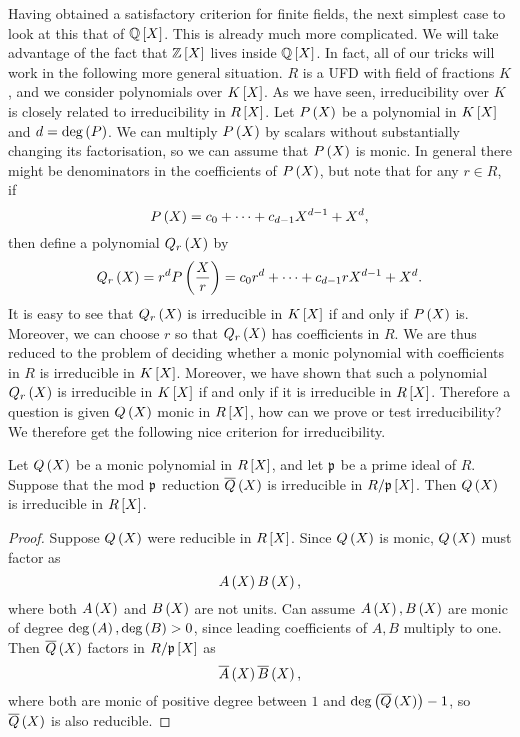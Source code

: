Having obtained a satisfactory criterion for finite fields, the next simplest case to look at this that of $ \Q\sb{X} $. This is already much more complicated. We will take advantage of the fact that $ \Z\sb{X} $ lives inside $ \Q\sb{X} $. In fact, all of our tricks will work in the following more general situation. $ R $ is a UFD with field of fractions $ K $, and we consider polynomials over $ K\sb{X} $. As we have seen, irreducibility over $ K $ is closely related to irreducibility in $ R\sb{X} $. Let $ P\rb{X} $ be a polynomial in $ K\sb{X} $ and $ d = \deg\rb{P} $. We can multiply $ P\rb{X} $ by scalars without substantially changing its factorisation, so we can assume that $ P\rb{X} $ is monic. In general there might be denominators in the coefficients of $ P\rb{X} $, but note that for any $ r \in R $, if
$$ P\rb{X} = c_0 + \dots + c_{d - 1}X^{d - 1} + X^d, $$
then define a polynomial $ Q_r\rb{X} $ by
$$ Q_r\rb{X} = r^dP\rb{\dfrac{X}{r}} = c_0r^d + \dots + c_{d - 1}rX^{d - 1} + X^d. $$
It is easy to see that $ Q_r\rb{X} $ is irreducible in $ K\sb{X} $ if and only if $ P\rb{X} $ is. Moreover, we can choose $ r $ so that $ Q_r\rb{X} $ has coefficients in $ R $. We are thus reduced to the problem of deciding whether a monic polynomial with coefficients in $ R $ is irreducible in $ K\sb{X} $. Moreover, we have shown that such a polynomial $ Q_r\rb{X} $ is irreducible in $ K\sb{X} $ if and only if it is irreducible in $ R\sb{X} $. Therefore a question is given $ Q\rb{X} $ monic in $ R\sb{X} $, how can we prove or test irreducibility? We therefore get the following nice criterion for irreducibility.

\begin{proposition}
Let $ Q\rb{X} $ be a monic polynomial in $ R\sb{X} $, and let $ \pp $ be a prime ideal of $ R $. Suppose that the mod $ \pp $ reduction $ \overline{Q}\rb{X} $ is irreducible in $ R / \pp\sb{X} $. Then $ Q\rb{X} $ is irreducible in $ R\sb{X} $.
\end{proposition}

\begin{proof}
Suppose $ Q\rb{X} $ were reducible in $ R\sb{X} $. Since $ Q\rb{X} $ is monic, $ Q\rb{X} $ must factor as
$$ A\rb{X}B\rb{X}, $$
where both $ A\rb{X} $ and $ B\rb{X} $ are not units. Can assume $ A\rb{X}, B\rb{X} $ are monic of degree $ \deg\rb{A}, \deg\rb{B} > 0 $, since leading coefficients of $ A, B $ multiply to one. Then $ \overline{Q}\rb{X} $ factors in $ R / \pp\sb{X} $ as
$$ \overline{A}\rb{X}\overline{B}\rb{X}, $$
where both are monic of positive degree between $ 1 $ and $ \deg\rb{\overline{Q}\rb{X}} - 1 $, so $ \overline{Q}\rb{X} $ is also reducible.
\end{proof}

